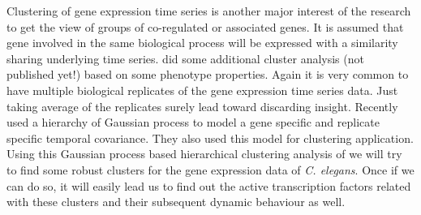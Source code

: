 Clustering of gene expression time series is another major interest of the research to get the view of
groups of co-regulated or associated genes. It is assumed that gene involved in the same biological 
process will be expressed with a similarity sharing underlying time series. \cite{Cossins:2007}
did some additional cluster analysis (not published yet!) based on some phenotype properties. Again 
it is very common to have multiple biological replicates of the gene expression time series data. 
Just taking average of the replicates surely lead toward discarding insight. Recently \cite{Hensman:2013} used
a hierarchy of Gaussian process to model a gene specific and replicate specific temporal covariance.
They also used this model for clustering application. Using this Gaussian process based hierarchical
clustering analysis of \cite{Hensman:2013} we will try to find some robust clusters for the gene
expression data of \textit{C. elegans}. Once if we can do so, it will easily lead us to find out the active
transcription factors related with these clusters and their subsequent dynamic behaviour as well.